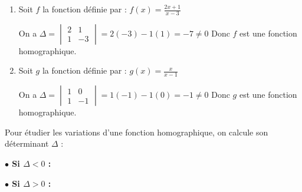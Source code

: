 \documentclass[10pt, a4paper]{article}
\begin{document}
\begin{Exemple}[][10 min]
\begin{enumerate}[leftmargin=*,itemsep=0.5pt]
    \item Soit $f$ la fonction définie par : $f(x) = \frac{2x+1}{x-3}$

    On a $\Delta = \begin{vmatrix} 2 & 1 \\ 1 & -3 \end{vmatrix} = 2(-3) - 1(1) = -7 \neq 0$
    \quad Donc $f$ est une fonction homographique.

    \item Soit $g$ la fonction définie par : $g(x) = \frac{x}{x-1}$

    On a  $\Delta = \begin{vmatrix} 1 & 0 \\ 1 & -1 \end{vmatrix} = 1(-1) - 1(0) = -1 \neq 0$
    \quad Donc $g$ est une fonction homographique.
\end{enumerate}
\end{Exemple}

\begin{Propriete}[Variations]

Pour étudier les variations d'une fonction homographique, on calcule son déterminant $\Delta$ :

\vspace{0.2cm}
\noindent
\begin{minipage}[t]{0.48\linewidth}
\begin{center}
\textbf{$\bullet$ Si $\Delta < 0$ :}
\end{center}
\vspace{0.2cm}
\begin{center}
\end{center}
\end{minipage}
\hfill
\begin{minipage}[t]{0.48\linewidth}
\begin{center}
\textbf{$\bullet$ Si $\Delta > 0$ :}
\end{center}
\vspace{0.2cm}
\begin{center}
\end{center}
\end{minipage}
\end{Propriete}
\end{document}
